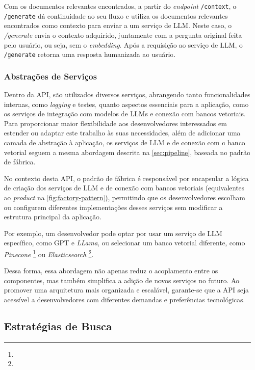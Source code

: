 \documentclass[a4paper, 12pt]{article}
\begin{document}
    Com os documentos relevantes encontrados, a partir do \textit{endpoint} \texttt{/context}, o \texttt{/generate} dá continuidade ao seu fluxo e utiliza os documentos relevantes encontrados como contexto para enviar a um serviço de LLM. Neste caso, o \textit{/generate} envia o contexto adquirido, juntamente com a pergunta original feita pelo usuário, ou seja, sem o \textit{embedding}. Após a requisição ao serviço de LLM, o \texttt{/generate} retorna uma resposta humanizada ao usuário.

    \subsubsection{Abstrações de Serviços} \label{sec:abstraction}

    Dentro da API, são utilizados diversos serviços, abrangendo tanto funcionalidades internas, como \textit{logging} e testes, quanto aspectos essenciais para a aplicação, como os serviços de integração com modelos de LLMs e conexão com bancos vetoriais. Para proporcionar maior flexibilidade aos desenvolvedores interessados em estender ou adaptar este trabalho às suas necessidades, além de adicionar uma camada de abstração à aplicação, os serviços de LLM e de conexão com o banco vetorial seguem a mesma abordagem descrita na \autoref{sec:pipeline}, baseada no padrão de fábrica.

    No contexto desta API, o padrão de fábrica é responsável por encapsular a lógica de criação dos serviços de LLM e de conexão com bancos vetoriais (equivalentes ao \textit{product} na \autoref{fig:factory-pattern}), permitindo que os desenvolvedores escolham ou configurem diferentes implementações desses serviços sem modificar a estrutura principal da aplicação. 
    
    Por exemplo, um desenvolvedor pode optar por usar um serviço de LLM específico, como GPT e \textit{LLama}, ou selecionar um banco vetorial diferente, como \textit{Pinecone} \footnote{} ou \textit{Elasticsearch} \footnote{}.
    
    Dessa forma, essa abordagem não apenas reduz o acoplamento entre os componentes, mas também simplifica a adição de novos serviços no futuro. Ao promover uma arquitetura mais organizada e escalável, garante-se que a API seja acessível a desenvolvedores com diferentes demandas e preferências tecnológicas.

    \subsection{Estratégias de Busca} \label{sec:strategies}
\end{document}
